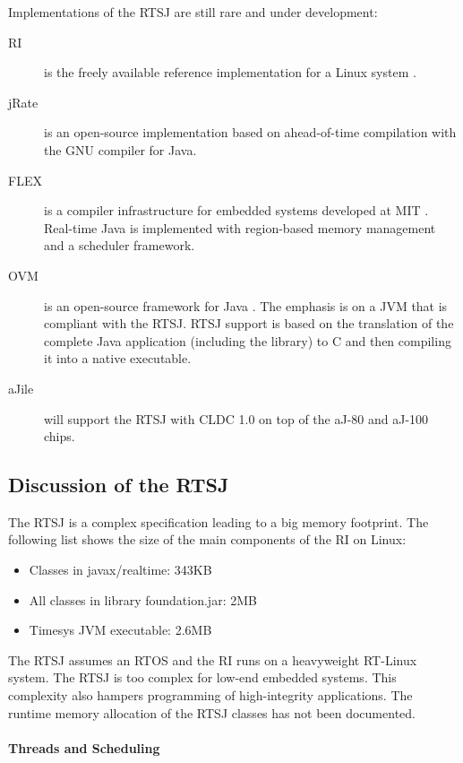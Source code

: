 Implementations of the RTSJ are still rare and under development:
%
\begin{description}
    \item[RI]
is the freely available reference implementation for a Linux system
\cite{rtsj-ri}.

    \item[jRate]
is an open-source implementation \cite{701668} based on
ahead-of-time compilation with the GNU compiler for Java.

    \item[FLEX]
is a compiler infrastructure for embedded systems developed at MIT
\cite{flex}. Real-time Java is implemented with region-based memory
management and a scheduler framework.

    \item[OVM]
is an open-source framework for Java \cite{ovmir2003}. The emphasis
is on a JVM that is compliant with the RTSJ. RTSJ support is based
on the translation of the complete Java application (including the
library) to C and then compiling it into a native executable.

    \item[aJile] will support the RTSJ with CLDC 1.0 on top of
    the aJ-80 and aJ-100 chips.
\end{description}


\subsection{Discussion of the RTSJ}

The RTSJ is a complex specification leading to a big memory
footprint. The following list shows the size of the main components
of the RI on Linux:
%
\begin{itemize}
    \item Classes in javax/realtime: 343KB
    \item All classes in library foundation.jar: 2MB
    \item Timesys JVM executable: 2.6MB
\end{itemize}
%
The RTSJ assumes an RTOS and the RI runs on a heavyweight RT-Linux
system. The RTSJ is too complex for low-end embedded systems. This
complexity also hampers programming of high-integrity applications.
The runtime memory allocation of the RTSJ classes has not been
documented.

\paragraph{Threads and Scheduling}

